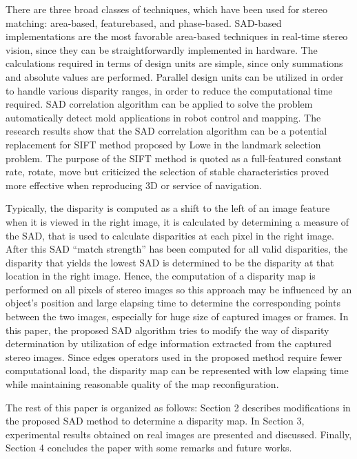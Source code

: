 There are three broad classes of techniques, which have
been used for stereo matching: area-based, featurebased, and phase-based. SAD-based implementations
are the most favorable area-based techniques in real-time
stereo vision, since they can be straightforwardly implemented
in hardware. The calculations required in terms of design units
are simple, since only summations and absolute values are
performed. Parallel design units can be utilized in order to
handle various disparity ranges, in order to reduce the
computational time required. SAD correlation algorithm
can be applied to solve the problem automatically detect mold
applications in robot control and mapping. The research
results show that the SAD correlation algorithm can be a
potential replacement for SIFT method proposed by Lowe in the landmark selection problem. The purpose of the
SIFT method is quoted as a full-featured constant rate,
rotate, move but criticized the selection of stable
characteristics proved more effective when reproducing 3D or
service of navigation.

Typically, the disparity is computed as a shift to the left of
an image feature when it is viewed in the right image, it is
calculated by determining a measure of the SAD, that is used
to calculate disparities at each pixel in the right image.
After this SAD “match strength” has been computed for all
valid disparities, the disparity that yields the lowest SAD is
determined to be the disparity at that location in the right
image. Hence, the computation of a disparity map is
performed on all pixels of stereo images so this approach may
be influenced by an object's position and large elapsing time to
determine the corresponding points between the two images,
especially for huge size of captured images or frames.
In this paper, the proposed SAD algorithm tries to modify
the way of disparity determination by utilization of edge
information extracted from the captured stereo images. Since
edges operators used in the proposed method require fewer
computational load, the disparity map can be represented with
low elapsing time while maintaining reasonable quality of the
map reconfiguration.

The rest of this paper is organized as follows: Section 2
describes modifications in the proposed SAD method to
determine a disparity map. In Section 3, experimental results
obtained on real images are presented and discussed. Finally,
Section 4 concludes the paper with some remarks and future
works. 
